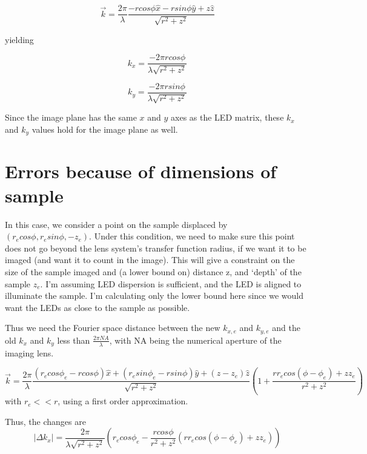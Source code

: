 \documentclass[11pt]{article}
\begin{document}
\begin{equation*}
\vec{k} = \frac{2 \pi}{\lambda} \frac{-r cos \phi \hat{x} - r sin \phi \hat{y} + z \hat{z}}{\sqrt{r^2 + z^2}}
\end{equation*}

yielding

\begin{equation*}
k_x = \frac{-2 \pi r cos \phi}{\lambda\sqrt{r^2 + z^2}}
\end{equation*}

\begin{equation*}
k_y = \frac{-2 \pi r sin \phi}{\lambda\sqrt{r^2 + z^2}}
\end{equation*}

Since the image plane has the same $x$ and $y$ axes as the LED matrix, these $k_x$ and $k_y$ values hold for the image plane as well. \pagebreak

\section{Errors because of dimensions of sample}
In this case, we consider a point on the sample displaced by $(r_e cos \phi , r_e sin \phi, -z_e)$. Under this condition, we need to make sure this point does not go beyond the lens system's transfer function radius, if we want it to be imaged (and want it to count in the image). This will give a constraint on the size of the sample imaged and (a lower bound on) distance z, and `depth' of the sample $z_e$. I'm assuming LED dispersion is sufficient, and the LED is aligned to illuminate the sample. I'm calculating only the lower bound here since we would want the LEDs as close to the sample as possible.

Thus we need the Fourier space distance between the new $k_{x, e}$ and $k_{y, e}$ and the old $k_x$ and $k_y$ less than $\frac{2 \pi NA}{\lambda}$, with NA being the numerical aperture of the imaging lens.

\begin{equation*}
\vec{k} = \frac{2\pi}{\lambda}\frac{(r_e cos \phi_e -r cos \phi) \hat{x} +(r_e sin \phi_e - r sin \phi) \hat{y} + (z-z_e) \hat{z}}{\sqrt{r^2 + z^2}} \left(1+\frac{rr_ecos(\phi - \phi _e)+zz_e}{r^2+z^2}\right)
\end{equation*}
with $r_e << r$, using a first order approximation.

Thus, the changes are
\begin{equation*}
|\Delta k_x| = \frac{2 \pi}{\lambda \sqrt{r^2+z^2}} \left(r_e cos \phi _e - \frac{r cos \phi }{r^2+z^2} (rr_e cos(\phi - \phi _e)+zz_e)\right)
\end{equation*}
\end{document}
